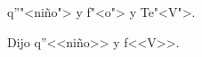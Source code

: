 \documentclass{article}
\begin{document}
q\textquotedblright "<niño"> y f"<o"> y Te"<V">.

Dijo q\textquotedblright <<niño>> y f<<V>>.
\end{document}
